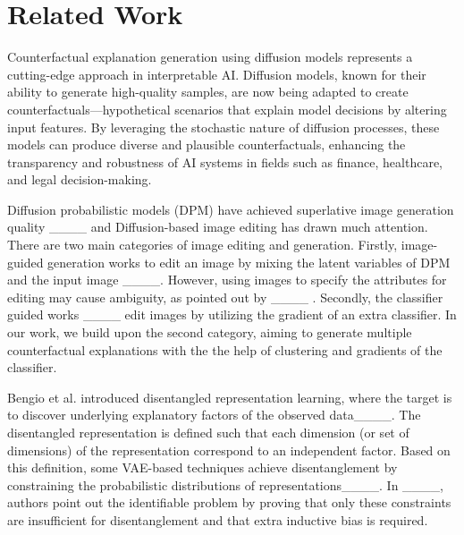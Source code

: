 \section{Related Work}
Counterfactual explanation generation using diffusion models represents a cutting-edge approach in interpretable AI. Diffusion models, known for their ability to generate high-quality samples, are now being adapted to create counterfactuals—hypothetical scenarios that explain model decisions by altering input features. By leveraging the stochastic nature of diffusion processes, these models can produce diverse and plausible counterfactuals, enhancing the transparency and robustness of AI systems in fields such as finance, healthcare, and legal decision-making.


Diffusion probabilistic models (DPM) have achieved superlative image generation quality ____ and  Diffusion-based image editing has drawn much attention. There are two main categories of image editing and generation. Firstly, image-guided generation works to edit an image by mixing the latent variables of DPM and the input image ____. However, using images to specify the attributes for editing may cause ambiguity, as pointed out by ____ . Secondly, the classifier guided works ____ edit images by utilizing the gradient of an extra classifier. In our work, we build upon the second category, aiming to generate multiple counterfactual explanations with the the help of clustering and gradients of the classifier.

Bengio et al. introduced disentangled representation learning, where the target is to discover underlying explanatory factors of the observed data____. The disentangled representation is defined such that each dimension (or set of dimensions) of the representation correspond to an independent factor. Based on this definition, some VAE-based techniques achieve disentanglement  by constraining the probabilistic distributions of representations____. In ____, authors point out the identifiable problem by proving that only these constraints are insufficient for disentanglement and that extra inductive bias is required. 

